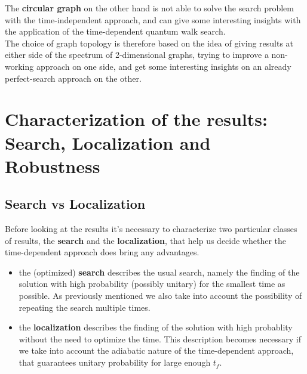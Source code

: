     The \textbf{circular graph} on the other hand is not able to solve the search problem with the time-independent approach, and can give some interesting insights with the application of the time-dependent quantum walk search.  \\

    The choice of graph topology is therefore based on the idea of giving results at either side of the spectrum of 2-dimensional graphs, trying to improve a non-working approach on one side, and get some interesting insights on an already perfect-search approach on the other.

\section{Characterization of the results: Search, Localization and Robustness}
    \subsection{Search vs Localization}
      Before looking at the results it's necessary to characterize two particular classes of results, the \textbf{search} and the \textbf{localization}, that help us decide whether the time-dependent approach does bring any advantages.
      \begin{itemize}
          \item the (optimized) \textbf{search} describes the usual search, namely the finding of the solution with high probability (possibly unitary) for the smallest time as possible. As previously mentioned we also take into account the possibility of repeating the search multiple times.
          \item the \textbf{localization} describes the finding of the solution with high probablity without the need to optimize the time. This description becomes necessary if we take into account the adiabatic nature of the time-dependent approach, that guarantees unitary probability for large enough $t_f$.
      \end{itemize}

